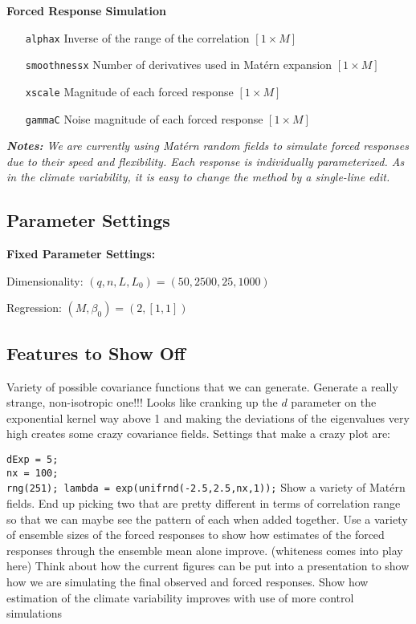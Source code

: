 \documentclass[11pt]{article}
\begin{document}
\textbf{Forced Response Simulation}
\begin{itemize}
\item[ \texttt{alphax}] Inverse of the range of the correlation $[1 \times M]$
\item[\texttt{smoothnessx}] Number of derivatives used in Mat\'ern expansion $[1 \times M]$
\item[\texttt{xscale}] Magnitude of each forced response $[1 \times M]$
\item[\texttt{gammaC}] Noise magnitude of each forced response $[1 \times M]$
\end{itemize}
\emph{\textbf{Notes: }We are currently using Mat\'ern random fields to simulate forced responses due to their speed and flexibility. Each response is individually parameterized. As in the climate variability, it is easy to change the method by a single-line edit.}

\clearpage
\subsection{Parameter Settings}
\textbf{Fixed Parameter Settings:} 

Dimensionality: $(q,n,L,L_0) = (50,2500,25,1000)$

Regression: $(M,\beta_0) = (2,[1,1])$



\subsection{Features to Show Off}
\begin{outline}
\1 Variety of possible covariance functions that we can generate. Generate a really strange, non-isotropic one!!!
\2 Looks like cranking up the $d$ parameter on the exponential kernel way above 1 and making the deviations of the eigenvalues very high creates some crazy covariance fields. Settings that make a crazy plot are: 

\texttt{dExp = 5; }\\
\texttt{nx = 100;}\\
\texttt{rng(251); lambda = exp(unifrnd(-2.5,2.5,nx,1));}
\1 Show a variety of Mat\'ern fields. End up picking two that are pretty different in terms of correlation range so that we can maybe see the pattern of each when added together.
\1 Use a variety of ensemble sizes of the forced responses to show how estimates of the forced responses through the ensemble mean alone improve. (whiteness comes into play here)
\1 Think about how the current figures can be put into a presentation to show how we are simulating the final observed and forced responses.
\1 Show how estimation of the climate variability improves with use of more control simulations

\end{outline}
\end{document}
